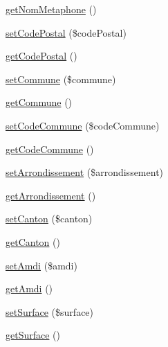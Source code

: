 \begin{DoxyCompactItemize}
\item 
\hyperlink{class_acme_group_1_1_labo_bundle_1_1_entity_1_1villes_france_a65f2d209d7df6d6b98adb10447475941}{get\+Nom\+Metaphone} ()
\item 
\hyperlink{class_acme_group_1_1_labo_bundle_1_1_entity_1_1villes_france_a6da7e881bcad6da4cdb0a7caaa0860c6}{set\+Code\+Postal} (\$code\+Postal)
\item 
\hyperlink{class_acme_group_1_1_labo_bundle_1_1_entity_1_1villes_france_a081fb67d34567c5516c24f36d8d49f7d}{get\+Code\+Postal} ()
\item 
\hyperlink{class_acme_group_1_1_labo_bundle_1_1_entity_1_1villes_france_a9f1cf3ca63e03f91318de9dd53e9a23d}{set\+Commune} (\$commune)
\item 
\hyperlink{class_acme_group_1_1_labo_bundle_1_1_entity_1_1villes_france_a03ab0e1f8ab51d5faddce1685f3627ec}{get\+Commune} ()
\item 
\hyperlink{class_acme_group_1_1_labo_bundle_1_1_entity_1_1villes_france_a70ed4fd3f7c6b038b3998415e22f5271}{set\+Code\+Commune} (\$code\+Commune)
\item 
\hyperlink{class_acme_group_1_1_labo_bundle_1_1_entity_1_1villes_france_a72e6e13e47959ed5d669ade0c05395e5}{get\+Code\+Commune} ()
\item 
\hyperlink{class_acme_group_1_1_labo_bundle_1_1_entity_1_1villes_france_a963a63344af27a23b8f17438dc5560b6}{set\+Arrondissement} (\$arrondissement)
\item 
\hyperlink{class_acme_group_1_1_labo_bundle_1_1_entity_1_1villes_france_abf674799dcc2a1d1b9314ee57b4fe556}{get\+Arrondissement} ()
\item 
\hyperlink{class_acme_group_1_1_labo_bundle_1_1_entity_1_1villes_france_a995b617c2f00b3ce2f8b5ad1b10e55f0}{set\+Canton} (\$canton)
\item 
\hyperlink{class_acme_group_1_1_labo_bundle_1_1_entity_1_1villes_france_a69f825c020b8f4b02f10fad8f99be3d0}{get\+Canton} ()
\item 
\hyperlink{class_acme_group_1_1_labo_bundle_1_1_entity_1_1villes_france_a378806f98f3059ef9d1a0bc3149e4b38}{set\+Amdi} (\$amdi)
\item 
\hyperlink{class_acme_group_1_1_labo_bundle_1_1_entity_1_1villes_france_a7c0d3745c65065e9a6c18c294ce6cf9e}{get\+Amdi} ()
\item 
\hyperlink{class_acme_group_1_1_labo_bundle_1_1_entity_1_1villes_france_a4c840a894c8f59f8073c3f76184bfb1e}{set\+Surface} (\$surface)
\item 
\hyperlink{class_acme_group_1_1_labo_bundle_1_1_entity_1_1villes_france_a977bea2ddf3ae6c5cf38cc162e526b54}{get\+Surface} ()

\end{DoxyCompactItemize}
